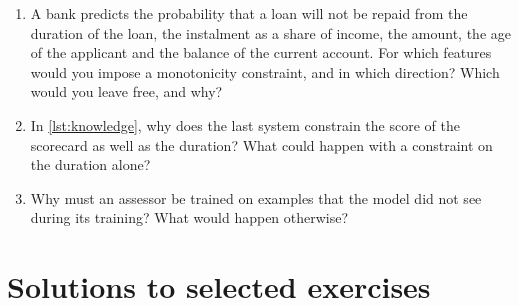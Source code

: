 \begin{enumerate}[label=\textbf{2.\arabic*},ref=2.\arabic*,leftmargin=*,itemsep=6pt]
        close to it within the time budget.
\item\label{exr2:monotone} A bank predicts the probability that a loan will not be repaid from the
duration of the loan, the instalment as a share of income, the amount, the age of the
applicant and the balance of the current account. For which features would you impose a
monotonicity constraint, and in which direction? Which would you leave free, and why?
\item\label{exr2:knowledge} In \cref{lst:knowledge}, why does the last system constrain the score of
the scorecard as well as the duration? What could happen with a constraint on the
duration alone?
\item\label{exr2:assessor} Why must an assessor be trained on examples that the model did not
see during its training? What would happen otherwise?
\end{enumerate}

\section*{Solutions to selected exercises}

